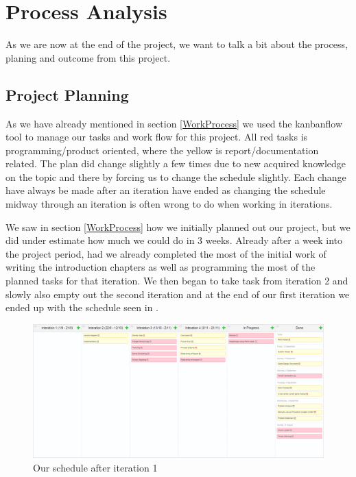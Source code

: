 \chapter{Process Analysis}

As we are now at the end of the project, we want to talk a bit about the process, planing and outcome from this project.


\section{Project Planning}
\label{ProjectPlanning}
As we have already mentioned in section \ref{WorkProcess} we used the kanbanflow tool to manage our tasks and work flow for this project. All red tasks is programming/product oriented, where the yellow is report/documentation related. The plan did change slightly a few times due to new acquired knowledge on the topic and there by forcing us to change the schedule slightly. Each change have always be made after an iteration have ended as changing the schedule midway through an iteration is often wrong to do when working in iterations.

We saw in section \ref{WorkProcess} how we initially planned out our project, but we did under estimate how much we could do in 3 weeks. Already after a week into the project period, had we already completed the most of the initial work of writing the introduction chapters as well as programming the most of the planned tasks for that iteration. We then began to take task from iteration 2 and slowly also empty out the second iteration and at the end of our first iteration we ended up with the schedule seen in .

\begin{figure}[H]
	\includegraphics[width=1.0\linewidth]{img/afteriteration1}
	\centering
	\caption{Our schedule after iteration 1}
	\label{fig:afteritration1}
\end{figure}

